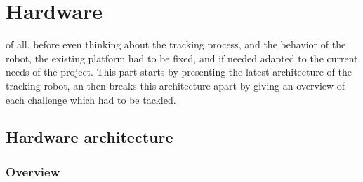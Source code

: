 
\chapter{Hardware}\label{hardware}

 of all, before even thinking about the tracking process, and
the behavior of the robot, the existing platform had to be fixed, and if needed adapted
to the current needs of the project. This part starts by presenting the latest architecture 
of the tracking robot, an then breaks this architecture apart by giving an overview of
each challenge which had to be tackled.
	
	\section{Hardware architecture}
		
		\subsection{Overview}\label{hardwareoverview}
		
